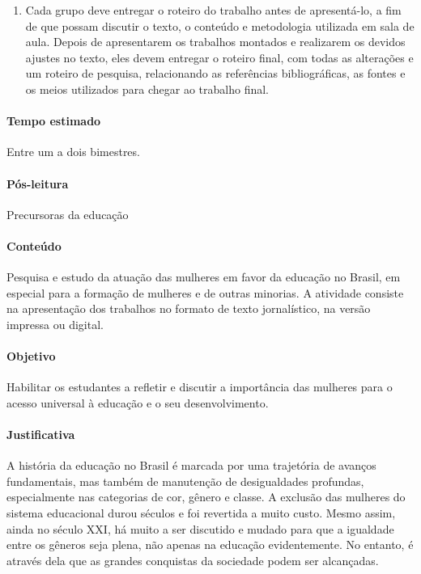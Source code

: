 \documentclass[12pt]{extarticle}
\begin{document}
\begin{enumerate}
\item
Cada grupo deve entregar o roteiro do trabalho antes de apresentá-lo,
a fim de que possam discutir o texto, o conteúdo e metodologia utilizada
em sala de aula. Depois de apresentarem os trabalhos montados e
realizarem os devidos ajustes no texto, eles devem entregar o roteiro
final, com todas as alterações e um roteiro de pesquisa, relacionando as
referências bibliográficas, as fontes e os meios utilizados para chegar
ao trabalho final.
\end{enumerate}

\paragraph{Tempo estimado} Entre um a dois bimestres.



\paragraph{Pós-leitura} Precursoras da educação



\paragraph{Conteúdo} Pesquisa e estudo da atuação das mulheres em favor da
educação no Brasil, em especial para a formação de mulheres e de outras
minorias. A atividade consiste na apresentação dos trabalhos no formato
de texto jornalístico, na versão impressa ou digital.

\paragraph{Objetivo} Habilitar os estudantes a refletir e discutir a
importância das mulheres para o acesso universal à educação e o seu
desenvolvimento.

\paragraph{Justificativa} A história da educação no Brasil é marcada por
uma trajetória de avanços fundamentais, mas também de manutenção de
desigualdades profundas, especialmente nas categorias de cor, gênero e
classe. A exclusão das mulheres do sistema educacional durou séculos e
foi revertida a muito custo. Mesmo assim, ainda no século XXI, há muito
a ser discutido e mudado para que a igualdade entre os gêneros seja
plena, não apenas na educação evidentemente. No entanto, é através dela
que as grandes conquistas da sociedade podem ser alcançadas.
\end{document}
